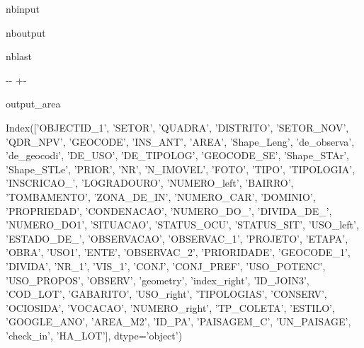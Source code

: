 \documentclass[letterpaper,10pt,brazil]{sphinxmanual}
\newlength\nbsphinxcodecellspacing
\begin{document}
\begin{sphinxuseclass}{nbinput}
{
\begin{sphinxVerbatim}[commandchars=\\\{\}]
\llap{\color{nbsphinxin}[5]:\,\hspace{\fboxrule}\hspace{\fboxsep}}
\end{sphinxVerbatim}
}

\end{sphinxuseclass}
\begin{sphinxuseclass}{nboutput}
\begin{sphinxuseclass}{nblast}
{

\kern-\sphinxverbatimsmallskipamount\kern-\baselineskip
\kern+\FrameHeightAdjust\kern-\fboxrule
\vspace{\nbsphinxcodecellspacing}

\begin{sphinxuseclass}{output_area}
\begin{sphinxuseclass}{}


\begin{sphinxVerbatim}[commandchars=\\\{\}]
\llap{\color{nbsphinxout}[5]:\,\hspace{\fboxrule}\hspace{\fboxsep}}Index(['OBJECTID\_1', 'SETOR', 'QUADRA', 'DISTRITO', 'SETOR\_NOV', 'QDR\_NPV',
       'GEOCODE', 'INS\_ANT', 'AREA', 'Shape\_Leng', 'de\_observa', 'de\_geocodi',
       'DE\_USO', 'DE\_TIPOLOG', 'GEOCODE\_SE', 'Shape\_STAr', 'Shape\_STLe',
       'PRIOR', 'NR', 'N\_IMOVEL', 'FOTO', 'TIPO', 'TIPOLOGIA', 'INSCRICAO\_',
       'LOGRADOURO', 'NUMERO\_left', 'BAIRRO', 'TOMBAMENTO', 'ZONA\_DE\_IN',
       'NUMERO\_CAR', 'DOMINIO', 'PROPRIEDAD', 'CONDENACAO', 'NUMERO\_DO\_',
       'DIVIDA\_DE\_', 'NUMERO\_DO1', 'SITUACAO', 'STATUS\_OCU', 'STATUS\_SIT',
       'USO\_left', 'ESTADO\_DE\_', 'OBSERVACAO', 'OBSERVAC\_1', 'PROJETO',
       'ETAPA', 'OBRA', 'USO1', 'ENTE', 'OBSERVAC\_2', 'PRIORIDADE',
       'GEOCODE\_1', 'DIVIDA', 'NR\_1', 'VIS\_1', 'CONJ', 'CONJ\_PREF',
       'USO\_POTENC', 'USO\_PROPOS', 'OBSERV', 'geometry', 'index\_right',
       'ID\_JOIN3', 'COD\_LOT', 'GABARITO', 'USO\_right', 'TIPOLOGIAS', 'CONSERV',
       'OCIOSIDA', 'VOCACAO', 'NUMERO\_right', 'TP\_COLETA', 'ESTILO',
       'GOOGLE\_ANO', 'AREA\_M2', 'ID\_PA', 'PAISAGEM\_C', 'UN\_PAISAGE',
       'check\_in', 'HA\_LOT'],
      dtype='object')
\end{sphinxVerbatim}




\end{sphinxuseclass}
\end{sphinxuseclass}}
\end{sphinxuseclass}
\end{sphinxuseclass}
\end{document}
